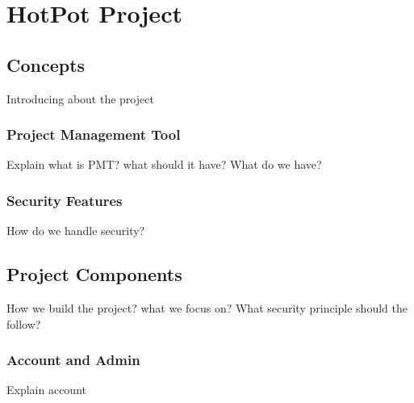 
\chapter{HotPot Project} %

\label{ch:hopot_project} %


\section{Concepts}

Introducing about the project


\subsection{Project Management Tool}

Explain what is PMT? what should it have? What do we have?


\subsection{Security Features}

How do we handle security?


\section{Project Components}

How we build the project? what we focus on? What security principle should the follow?


\subsection{Account and Admin}

Explain account


